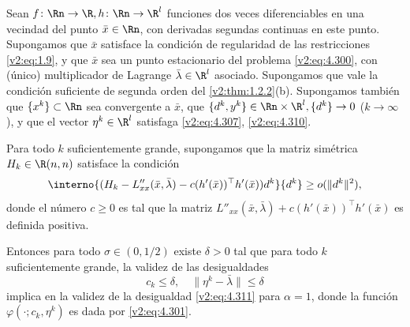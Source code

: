 \begin{theorem}\label{v2:thm:4.6.4}
Sean $f \colon \Rn \to \R, h \colon \Rn \to \R^l$ funciones dos veces diferenciables en una vecindad del punto $\bar{x} \in \Rn$, con derivadas segundas continuas en este punto. Supongamos que $\bar{x}$ satisface la condición de regularidad de las restricciones \eqref{v2:eq:1.9}, y que $\bar{x}$ sea un punto estacionario del problema \eqref{v2:eq:4.300}, con (único) multiplicador de Lagrange $\bar{\lambda} \in \R^l$ asociado. Supongamos que vale la condición suficiente de segunda orden del \cref{v2:thm:1.2.2}(b). Supongamos también que $\{x^k\} \subset \Rn$ sea convergente a $\bar{x}$, que $\{d^k, y^k\} \in \Rn \times \R^l, \{d^k\} \to 0$ ($k \to \infty$), y que el vector $\eta^k \in \R^l$ satisfaga \eqref{v2:eq:4.307}, \eqref{v2:eq:4.310}.

Para todo $k$ suficientemente grande, supongamos que la matriz simétrica $H_k \in \R(n,n)$ satisface la condición
\begin{equation}
\interno{(H_k - L''_{xx}(\bar{x}, \bar{\lambda}) - c (h'(\bar{x}))^\top h'(\bar{x}))d^k}{d^k} \ge o(\|d^k\|^2),
\label{v2:eq:4.312}
\end{equation}
donde el número $c \ge 0$ es tal que la matriz $L''_{xx}(\bar{x}, \bar{\lambda}) + c(h'(\bar{x}))^\top h'(\bar{x})$ es definida positiva.

Entonces para todo $\sigma \in (0, 1/2)$ existe $\delta > 0$ tal que para todo $k$ suficientemente grande, la validez de las desigualdades
\begin{equation}
c_k \le \delta, \quad \|\eta^k - \bar{\lambda}\| \le \delta
\label{v2:eq:4.313}
\end{equation}
implica en la validez de la desigualdad \eqref{v2:eq:4.311} para $\alpha = 1$, donde la función $\varphi(\cdot; c_k, \eta^k)$ es dada por \eqref{v2:eq:4.301}.
\end{theorem}

